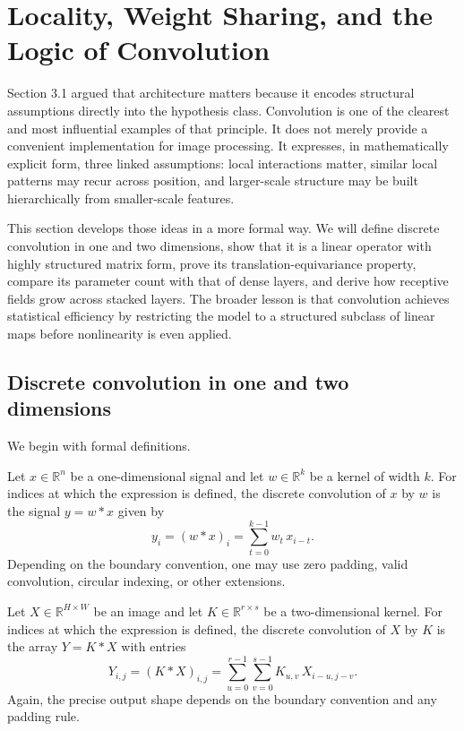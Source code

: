 \section{Locality, Weight Sharing, and the Logic of Convolution}

Section 3.1 argued that architecture matters because it encodes structural assumptions directly into the hypothesis class.
Convolution is one of the clearest and most influential examples of that principle.
It does not merely provide a convenient implementation for image processing.
It expresses, in mathematically explicit form, three linked assumptions:
local interactions matter,
similar local patterns may recur across position,
and larger-scale structure may be built hierarchically from smaller-scale features.

\medskip

This section develops those ideas in a more formal way.
We will define discrete convolution in one and two dimensions, show that it is a linear operator with highly structured matrix form, prove its translation-equivariance property, compare its parameter count with that of dense layers, and derive how receptive fields grow across stacked layers.
The broader lesson is that convolution achieves statistical efficiency by restricting the model to a structured subclass of linear maps before nonlinearity is even applied.

\subsection*{Discrete convolution in one and two dimensions}

We begin with formal definitions.

\begin{definition}
Let $x \in \mathbb{R}^n$ be a one-dimensional signal and let $w \in \mathbb{R}^k$ be a kernel of width $k$.
For indices at which the expression is defined, the discrete convolution of $x$ by $w$ is the signal $y = w * x$ given by
\[
 y_i = (w*x)_i = \sum_{t=0}^{k-1} w_t\, x_{i-t}.
\]
Depending on the boundary convention, one may use zero padding, valid convolution, circular indexing, or other extensions.
\end{definition}

\begin{definition}
Let $X \in \mathbb{R}^{H \times W}$ be an image and let $K \in \mathbb{R}^{r \times s}$ be a two-dimensional kernel.
For indices at which the expression is defined, the discrete convolution of $X$ by $K$ is the array $Y = K * X$ with entries
\[
 Y_{i,j} = (K*X)_{i,j} = \sum_{u=0}^{r-1}\sum_{v=0}^{s-1} K_{u,v}\, X_{i-u,j-v}.
\]
Again, the precise output shape depends on the boundary convention and any padding rule.
\end{definition}

